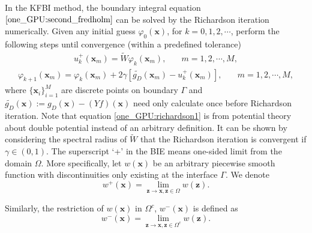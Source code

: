 \documentclass{article}
\begin{document}
In the KFBI method, the boundary integral equation $\eqref{one_GPU:second_fredholm}$ can be solved by the Richardson iteration numerically. Given any initial guess $\varphi_{0}(\mathbf{x})$, for $k = 0, 1, 2,  \cdots$, perform the following steps until convergence (within a predefined tolerance)
\begin{align}
    u_{k}^{+}(\mathbf{x}_{m}) = \widetilde{W}\varphi_{k}(\mathbf{x}_{m}), & \quad m = 1, 2, \cdots, M, \label{one_GPU:richardson1} 
\end{align}
\begin{align}
     \varphi_{k+1}(\mathbf{x}_{m}) = \varphi_{k}(\mathbf{x}_{m}) + 2 \gamma [\widetilde{g_{D}}(\mathbf{x}_{m}) - u_{k}^{+}(\mathbf{x}_{m})], & \quad m = 1, 2, \cdots, M, \label{one_GPU:richardson2} 
\end{align}
where $\{\mathbf{x}_i\}_{i = 1}^M$ are discrete points on boundary $\Gamma$ and $\widetilde{g_{D}}(\mathbf{x}) := g_{D}(\mathbf{x}) - (Yf)(\mathbf{x})$ need only calculate once before Richardson iteration. Note that equation \eqref{one_GPU:richardson1} is from potential theory about double potential \cite{jwason1963} instead of an arbitrary definition. It can be shown by considering the spectral radius of $\widetilde{W}$ that the Richardson iteration is convergent if $\gamma \in (0, 1)$.  The superscript `+' in the BIE means one-sided limit from the domain $\Omega$. More specifically, let $w(\mathbf{x})$ be an arbitrary piecewise smooth function with discontinuities only existing at the interface $\Gamma$. We denote
 \begin{equation}
     w^{+}(\mathbf{x}) = \lim_{\mathbf{z} \to \mathbf{x}, \mathbf{z} \in \Omega} w(\mathbf{z}).
 \end{equation}

Similarly, the restriction of $w(\mathbf{x})$ in $\Omega^{c}$, $w^{-}(\mathbf{x})$ is defined as 
\begin{equation}
    w^{-}(\mathbf{x}) = \lim_{\mathbf{z} \to \mathbf{x}, \mathbf{z} \in \Omega^{c}} w(\mathbf{z}).
\end{equation}
\end{document}
